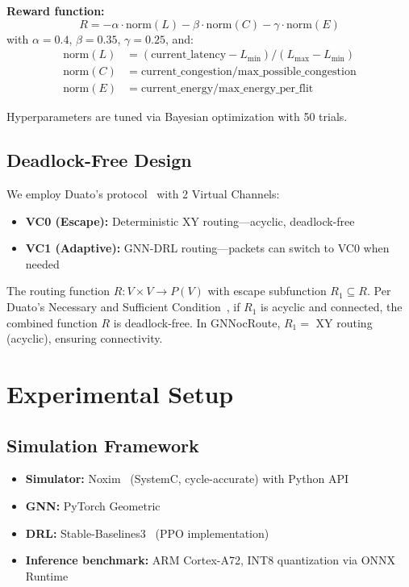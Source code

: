 \documentclass[conference]{IEEEtran}
\begin{document}
\textbf{Reward function:}
\begin{equation}
R = -\alpha\cdot\text{norm}(L) - \beta\cdot\text{norm}(C) - \gamma\cdot\text{norm}(E)
\label{eq:reward}
\end{equation}
with $\alpha=0.4$, $\beta=0.35$, $\gamma=0.25$, and:
\begin{align}
\text{norm}(L) &= (\text{current\_latency} - L_{\min})/(L_{\max} - L_{\min}) \nonumber\\
\text{norm}(C) &= \text{current\_congestion} / \text{max\_possible\_congestion} \nonumber\\
\text{norm}(E) &= \text{current\_energy} / \text{max\_energy\_per\_flit} \nonumber
\end{align}

Hyperparameters are tuned via Bayesian optimization with 50 trials.

\subsection{Deadlock-Free Design}
\label{sec:deadlock}

We employ Duato's protocol~\cite{duato1996} with 2 Virtual Channels:
\begin{itemize}
 \item \textbf{VC0 (Escape):} Deterministic XY routing---acyclic, deadlock-free
 \item \textbf{VC1 (Adaptive):} GNN-DRL routing---packets can switch to VC0 when needed
\end{itemize}

The routing function $R: V\times V\to P(V)$ with escape subfunction $R_1\subseteq R$. Per Duato's Necessary and Sufficient Condition~\cite{duato1996}, if $R_1$ is acyclic and connected, the combined function $R$ is deadlock-free. In GNNocRoute, $R_1 =$ XY routing (acyclic), ensuring connectivity.

\section{Experimental Setup}
\label{sec:experiment}

\subsection{Simulation Framework}
\begin{itemize}
 \item \textbf{Simulator:} Noxim~\cite{noxim2016} (SystemC, cycle-accurate) with Python API
 \item \textbf{GNN:} PyTorch Geometric~\cite{pyg2019}
 \item \textbf{DRL:} Stable-Baselines3~\cite{sb3} (PPO implementation)
 \item \textbf{Inference benchmark:} ARM Cortex-A72, INT8 quantization via ONNX Runtime
\end{itemize}
\end{document}
